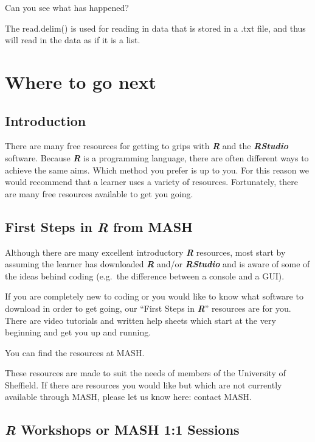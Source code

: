 \documentclass[
]{book}
\begin{document}
Can you see what has happened?

The read.delim() is used for reading in data that is stored in a .txt file, and thus will read in the data as if it is a list.

\chapter{Where to go next}\label{where-to-go-next-1}

\section{Introduction}\label{introduction-10}

There are many free resources for getting to grips with \textbf{\emph{R}} and the \textbf{\emph{RStudio}} software. Because \textbf{\emph{R}} is a programming language, there are often different ways to achieve the same aims. Which method you prefer is up to you. For this reason we would recommend that a learner uses a variety of resources. Fortunately, there are many free resources available to get you going.

\section{\texorpdfstring{First Steps in \textbf{\emph{R}} from MASH}{First Steps in R from MASH}}\label{first-steps-in-r-from-mash}

Although there are many excellent introductory \textbf{\emph{R}} resources, most start by assuming the learner has downloaded \textbf{\emph{R}} and/or \textbf{\emph{RStudio}} and is aware of some of the ideas behind coding (e.g.~the difference between a console and a GUI).

If you are completely new to coding or you would like to know what software to download in order to get going, our ``First Steps in \textbf{\emph{R}}'' resources are for you. There are video tutorials and written help sheets which start at the very beginning and get you up and running.

You can find the resources at MASH.

These resources are made to suit the needs of members of the University of Sheffield. If there are resources you would like but which are not currently available through MASH, please let us know here: contact MASH.

\section{\texorpdfstring{\textbf{\emph{R}} Workshops or MASH 1:1 Sessions}{R Workshops or MASH 1:1 Sessions}}\label{r-workshops-or-mash-11-sessions}
\end{document}
